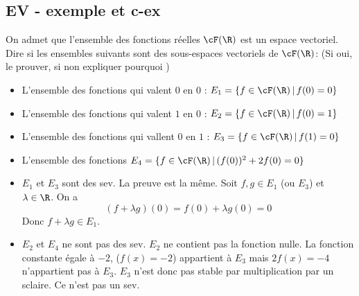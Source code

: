 \subsection{EV - exemple et c-ex}

\begin{exercice}
On admet que l'ensemble des fonctions réelles $\cF(\R)$ est un espace vectoriel. 
Dire si les ensembles suivants sont des sous-espaces vectoriels de $\cF(\R)$: 
(Si oui, le prouver, si non expliquer pourquoi )
\begin{itemize}
\item L'ensemble des fonctions qui valent $0$ en $0$ : $E_1 = \{ f \in  \cF(\R)\, |\, f(0)=0 \}$ 
\item L'ensemble des fonctions qui valent $1$ en $0$ : $E_2 = \{ f \in  \cF(\R)\, |\, f(0)=1 \}$ 
\item L'ensemble des fonctions qui vallent $0$ en $1$ : $E_3 = \{ f \in  \cF(\R)\, |\, f(1)=0 \}$
\item L'ensemble des fonctions $E_4 = \{ f \in  \cF(\R)\, |\, (f(0))^2 +2f(0)=0 \}$
\end{itemize}


\end{exercice}
\begin{correction}
\begin{itemize}
\item $E_1$  et $E_3$ sont des  sev. La preuve est la même. Soit $f, g\in E_1 $ (ou $E_3$) et $\lambda\in \R$. On a 
$$(f+\lambda g) (0)  = f(0)+\lambda g(0) = 0$$
Donc $f+\lambda g \in E_1$. 
\item $E_2$ et $E_4$ ne sont pas des sev.  $E_2$ ne contient pas la fonction nulle. 
La fonction constante égale à $-2$, ($f(x) =-2$) appartient à  $E_3$  mais $2f(x) =-4$ n'appartient pas à $E_3$. $E_3$ n'est donc pas stable par multiplication par un sclaire. Ce n'est pas un sev.  

\end{itemize}
\end{correction}